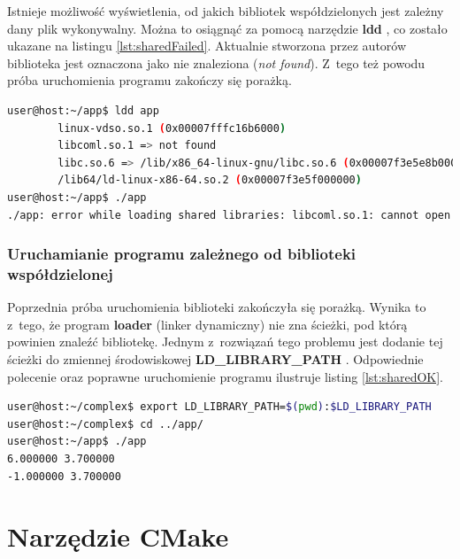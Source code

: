 Istnieje możliwość wyświetlenia, od jakich bibliotek współdzielonych jest zależny dany plik wykonywalny. Można to osiągnąć za pomocą narzędzie \textbf{ldd} \cite{shared2}, co zostało ukazane na listingu \ref{lst:sharedFailed}. Aktualnie stworzona przez autorów biblioteka jest oznaczona jako nie znaleziona (\textit{not found}). Z~tego też powodu próba uruchomienia programu zakończy się porażką. 

\newpage

\begin{lstlisting}[language=bash, language=Cmd, caption={Użycie polecenia \textit{ldd} i~pierwsza, nieudana próba uruchomienia aplikacji zależnej od biblioteki współdzielonej}, label={lst:sharedFailed}]
user@host:~/app$ ldd app
        linux-vdso.so.1 (0x00007fffc16b6000)
        libcoml.so.1 => not found
        libc.so.6 => /lib/x86_64-linux-gnu/libc.so.6 (0x00007f3e5e8b0000)
        /lib64/ld-linux-x86-64.so.2 (0x00007f3e5f000000)
user@host:~/app$ ./app
./app: error while loading shared libraries: libcoml.so.1: cannot open shared object file: No such file or directory
\end{lstlisting}

\subsubsection*{Uruchamianie programu zależnego od biblioteki współdzielonej}
Poprzednia próba uruchomienia biblioteki zakończyła się porażką. Wynika to z~tego, że program \textbf{loader} (linker dynamiczny) nie zna ścieżki, pod którą powinien znaleźć bibliotekę. Jednym z~rozwiązań tego problemu jest dodanie tej ścieżki do zmiennej środowiskowej \textbf{LD\_LIBRARY\_PATH} \cite{shared3}. Odpowiednie polecenie oraz poprawne uruchomienie programu ilustruje listing \ref{lst:sharedOK}.

\begin{lstlisting}[language=bash, language=Cmd, caption={Dodanie ścieżki zawierającej bibliotekę do zmiennej \textit{LD\_LIBRARY\_PATH} i~poprawne uruchomienie przykładowej aplikacji}, label={lst:sharedOK}]
user@host:~/complex$ export LD_LIBRARY_PATH=$(pwd):$LD_LIBRARY_PATH
user@host:~/complex$ cd ../app/
user@host:~/app$ ./app
6.000000 3.700000
-1.000000 3.700000
\end{lstlisting}


\section{Narzędzie CMake}


